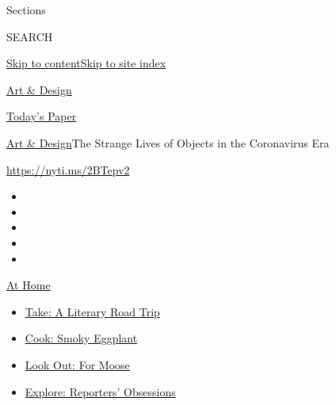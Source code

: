 Sections

SEARCH

\protect\hyperlink{site-content}{Skip to
content}\protect\hyperlink{site-index}{Skip to site index}

\href{https://www.nytimes3xbfgragh.onion/section/arts/design}{Art \&
Design}

\href{https://myaccount.nytimes3xbfgragh.onion/auth/login?response_type=cookie\&client_id=vi}{}

\href{https://www.nytimes3xbfgragh.onion/section/todayspaper}{Today's
Paper}

\href{/section/arts/design}{Art \& Design}\textbar{}The Strange Lives of
Objects in the Coronavirus Era

\url{https://nyti.ms/2BTepv2}

\begin{itemize}
\item
\item
\item
\item
\item
\end{itemize}

\href{https://www.nytimes3xbfgragh.onion/spotlight/at-home?action=click\&pgtype=Article\&state=default\&region=TOP_BANNER\&context=at_home_menu}{At
Home}

\begin{itemize}
\tightlist
\item
  \href{https://www.nytimes3xbfgragh.onion/2020/07/28/books/time-for-a-literary-road-trip.html?action=click\&pgtype=Article\&state=default\&region=TOP_BANNER\&context=at_home_menu}{Take:
  A Literary Road Trip}
\item
  \href{https://www.nytimes3xbfgragh.onion/2020/07/29/magazine/bored-with-your-home-cooking-some-smoky-eggplant-will-fix-that.html?action=click\&pgtype=Article\&state=default\&region=TOP_BANNER\&context=at_home_menu}{Cook:
  Smoky Eggplant}
\item
  \href{https://www.nytimes3xbfgragh.onion/2020/07/27/travel/moose-michigan-isle-royale.html?action=click\&pgtype=Article\&state=default\&region=TOP_BANNER\&context=at_home_menu}{Look
  Out: For Moose}
\item
  \href{https://www.nytimes3xbfgragh.onion/interactive/2020/at-home/even-more-reporters-editors-diaries-lists-recommendations.html?action=click\&pgtype=Article\&state=default\&region=TOP_BANNER\&context=at_home_menu}{Explore:
  Reporters' Obsessions}
\end{itemize}

